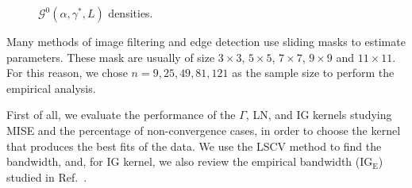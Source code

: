 \documentclass[twocolumn]{svjour3}
\begin{document}
\begin{figure}[hbt]
	\centering
	\caption{$\mathcal{G}^0(\alpha,\gamma^*,L)$ densities.}\label{densidades} 
\end{figure}

Many methods of image filtering and edge detection use sliding masks to estimate parameters. 
These mask are usually of size $3 \times 3$, $5 \times 5$, $7 \times 7$, $9 \times 9$ and $11 \times 11$. 
For this reason, we chose $n=9,25,49,81,121$ as the sample size to perform the empirical analysis.

%    
First of all, we evaluate the performance of the $\Gamma$, LN, and IG kernels studying MISE and the percentage of non-convergence cases, in order to choose the kernel that produces the best fits of the data. 
We use the LSCV method to find the bandwidth, and, for IG kernel, we also review the empirical bandwidth ($\text{IG}_{\text{E}}$) studied in Ref.~\cite{gambini2015}. 
\end{document}
